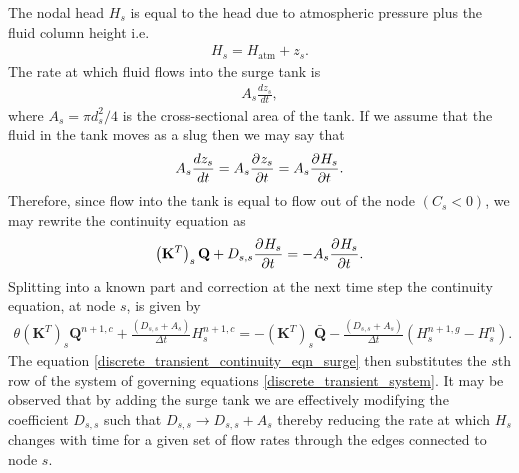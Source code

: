 The nodal head $H_s$ is equal to the head due to atmospheric pressure plus the fluid column height i.e.
\begin{align}
H_s = H_{\text{atm}} + z_s.
\end{align} 
The rate at which fluid flows into the surge tank is
\begin{align*}
A_s \frac{d z_s}{d t},
\end{align*}
where $A_s = \pi d_s^2 / 4$ is the cross-sectional area of the tank. If we assume that the fluid in the tank moves as a slug then we may say that
 \begin{align*}
A_s \frac{d z_s}{d t} = A_s \frac{\partial^{} z_s}{\partial t^{}} = A_s \frac{\partial^{} H_s}{\partial t^{}}.
\end{align*}
Therefore, since flow into the tank is equal to flow out of the node $(C_s < 0)$, we may rewrite the continuity equation as
\begin{align*}
\left( \mathbf{K}^T \right)_s \mathbf{Q} + D_{s,s} \frac{\partial^{} H_s}{\partial t^{}} = - A_s \frac{\partial^{} H_s}{\partial t^{}}.
\end{align*}
Splitting into a known part and correction at the next time step the continuity equation, at node $s$, is given by
\begin{align}\label{discrete_transient_continuity_eqn_surge}
\theta \left( \mathbf{K}^T \right)_s \mathbf{Q}^{n+1,c} + \frac{(D_{s,s} + A_s)}{\Delta t} H_s^{n+1,c} = - \left( \mathbf{K}^T \right)_s \bar{\mathbf{Q}} - \frac{(D_{s,s} + A_s)}{\Delta t} \left( H_s^{n+1,g} - H_s^{n} \right).
\end{align}
The equation \eqref{discrete_transient_continuity_eqn_surge} then substitutes the $s$th row of the system of governing equations \eqref{discrete_transient_system}. It may be observed that by adding the surge tank we are effectively modifying the coefficient $D_{s,s}$ such that $D_{s,s} \rightarrow D_{s,s} + A_s$ thereby reducing the rate at which $H_s$ changes with time for a given set of flow rates through the edges connected to node $s$. 
